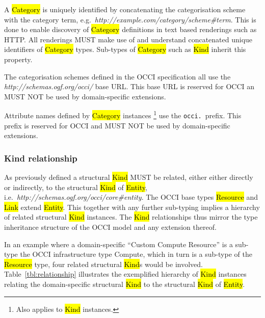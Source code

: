 \documentclass[10pt,a4paper,british]{article}
\begin{document}
A \hl{Category} is uniquely identified by concatenating the categorisation
scheme with the category term,
e.g.~\textit{http://example.com/category/scheme\#term}.
This is done to enable discovery of \hl{Category} definitions in text based
renderings such as HTTP. All renderings MUST make use of and understand
concatenated unique identifiers of \hl{Category} types.
%
Sub-types of \hl{Category} such as \hl{Kind} inherit this property.

The categorisation schemes defined in the OCCI specification all use the
\textit{http://schemas.ogf.org/occi/} base URL. This base URL is reserved for
OCCI an MUST NOT be used by domain-specific extensions.

Attribute names defined by \hl{Category} instances%
\footnote{Also applies to \hl{Kind} instances.}
use the \texttt{occi.}~prefix.  This prefix is reserved for OCCI and MUST NOT
be used by domain-specific extensions.

\subsubsection{Kind relationship}
\label{sec:type_relationship}
As previously defined a structural \hl{Kind} MUST be related, either
either directly or indirectly, to the structural \hl{Kind} of \hl{Entity},
i.e.~\textit{http://schemas.ogf.org/occi/core\#entity}.
%
The OCCI base types \hl{Resource} and \hl{Link} extend \hl{Entity}.  This
together with any further sub-typing implies a hierarchy of related structural
\hl{Kind} instances.  The \hl{Kind} relationships thus mirror the type
inheritance structure of the OCCI model and any extension thereof.

In an example where a domain-specific ``Custom Compute Resource'' is a sub-type
the OCCI infrastructure type Compute, which in turn is a sub-type of the
\hl{Resource} type, four related structural \hl{Kind}s would be involved.
%
Table~\ref{tbl:relationship} illustrates the exemplified hierarchy of \hl{Kind}
instances relating the domain-specific structural \hl{Kind} to the structural
\hl{Kind} of \hl{Entity}.

\end{document}
